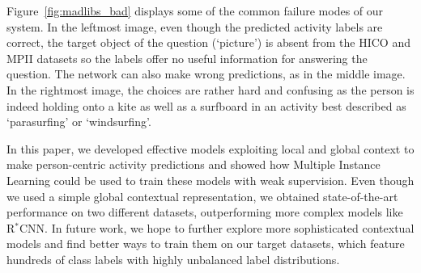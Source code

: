 \documentclass[runningheads]{llncs}
\begin{document}
Figure~\ref{fig:madlibs_bad} displays some of the common failure modes of our system. In the leftmost image, even though the predicted activity labels are correct, the target object of the question (`picture') is absent from the HICO and MPII datasets so the labels offer no useful information for answering the question. The network can also make wrong predictions, as in the middle image. In the rightmost image, the choices are rather hard and confusing as the person is indeed holding onto a kite as well as a surfboard in an activity best described as `parasurfing' or `windsurfing'.


In this paper, we developed effective models exploiting local and global context to make person-centric activity predictions and showed how Multiple Instance Learning could be used to train these models with weak supervision. Even though we used a simple global contextual representation, we obtained state-of-the-art performance on two different datasets, outperforming more complex models like R$^*$CNN. In future work, we hope to further explore more sophisticated contextual models and find better ways to train them on our target datasets, which feature hundreds of class labels with highly unbalanced label distributions.
\end{document}
